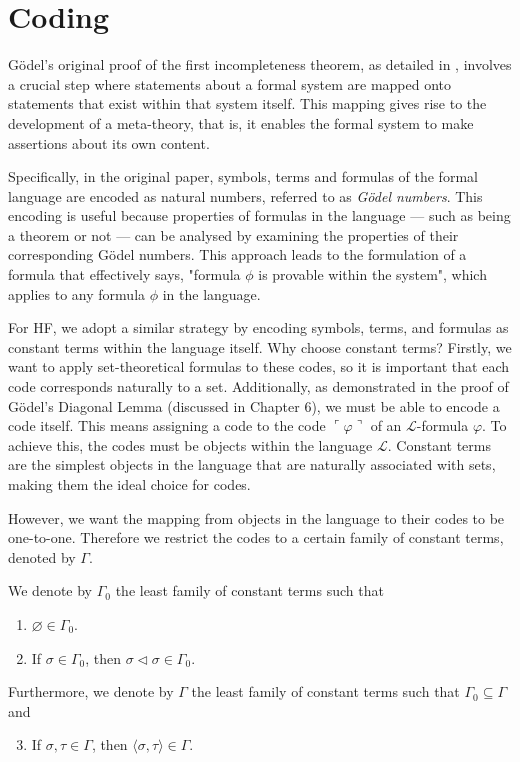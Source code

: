 \chapter{Coding}

Gödel's original proof of the first incompleteness theorem, 
as detailed in \cite{godel1931formal}, 
involves a crucial step where statements about a formal system are mapped onto statements that 
exist within that system itself. 
This mapping gives rise to the development of a meta-theory, that is, 
it enables the formal system to make assertions about its own content.

Specifically, in the original paper, symbols, terms and formulas of the formal language are encoded 
as natural numbers, referred to as \textit{Gödel numbers}. 
This encoding is useful because properties of formulas in the language 
— such as being a theorem or not — 
can be analysed by examining the properties of their corresponding Gödel numbers. 
This approach leads to the formulation of a formula that effectively says, 
"formula $\phi$ is provable within the system", which applies to any formula $\phi$ in the language.

For HF, we adopt a similar strategy by encoding symbols, terms, and formulas 
as constant terms within the language itself. Why choose constant terms?
Firstly, we want to apply set-theoretical formulas to these codes, 
so it is important that each code corresponds naturally to a set. 
Additionally, as demonstrated in the proof of Gödel’s Diagonal Lemma (discussed in Chapter 6), 
we must be able to encode a code itself. 
This means assigning a code to the code $\ulcorner{\varphi}\urcorner$ of an 
$\mathcal{L}$-formula $\varphi$. 
To achieve this, the codes must be objects within the language $\mathcal{L}$. 
Constant terms are the simplest objects in the language that are naturally associated with sets, 
making them the ideal choice for codes.

However, we want the mapping from objects in the language to their codes to be one-to-one.
Therefore we restrict the codes to a certain family of constant terms, denoted by $\Gamma$.

\begin{definition}
    \label{def:C.IsInΓ0+C.IsInΓ+Code}
    \leanok
    We denote by $\Gamma_0$ the least family of constant terms such that
    \begin{enumerate}
        \item $\varnothing \in \Gamma_0$.
        \item If $\sigma \in \Gamma_0$, then $\sigma \lhd \sigma \in \Gamma_0$.
    \end{enumerate}
    Furthermore, we denote by $\Gamma$ the least family of constant terms such that
    $\Gamma_0 \subseteq \Gamma$ and 
    \begin{enumerate}\setcounter{enumi}{2} %
        \item If $\sigma, \tau \in \Gamma$, then $\langle\sigma, \tau\rangle \in \Gamma$.
    \end{enumerate}
\end{definition}

